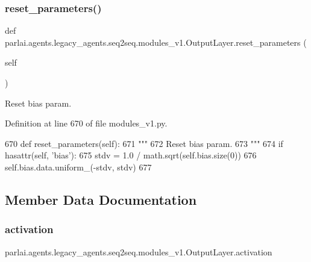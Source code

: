\subsubsection{\texorpdfstring{reset\+\_\+parameters()}{reset\_parameters()}}
{\footnotesize\ttfamily def parlai.\+agents.\+legacy\+\_\+agents.\+seq2seq.\+modules\+\_\+v1.\+Output\+Layer.\+reset\+\_\+parameters (\begin{DoxyParamCaption}\item[{}]{self }\end{DoxyParamCaption})}

\begin{DoxyVerb}Reset bias param.
\end{DoxyVerb}
 

Definition at line 670 of file modules\+\_\+v1.\+py.


\begin{DoxyCode}
670     \textcolor{keyword}{def }reset\_parameters(self):
671         \textcolor{stringliteral}{"""}
672 \textcolor{stringliteral}{        Reset bias param.}
673 \textcolor{stringliteral}{        """}
674         \textcolor{keywordflow}{if} hasattr(self, \textcolor{stringliteral}{'bias'}):
675             stdv = 1.0 / math.sqrt(self.bias.size(0))
676             self.bias.data.uniform\_(-stdv, stdv)
677 
\end{DoxyCode}


\subsection{Member Data Documentation}
\mbox{\label{classparlai_1_1agents_1_1legacy__agents_1_1seq2seq_1_1modules__v1_1_1OutputLayer_ad3133ae3076f535f3a4e6c1e0c151082}} 
\subsubsection{\texorpdfstring{activation}{activation}}
{\footnotesize\ttfamily parlai.\+agents.\+legacy\+\_\+agents.\+seq2seq.\+modules\+\_\+v1.\+Output\+Layer.\+activation}



